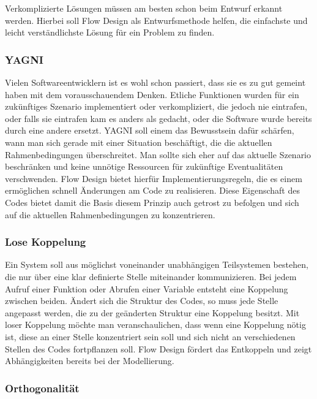 Verkomplizierte Lösungen müssen am besten schon beim Entwurf erkannt werden.
Hierbei soll Flow Design als Entwurfsmethode helfen, die einfachste und leicht
verständlichste Lösung für ein Problem zu finden.

\subsubsection{YAGNI}

Vielen Softwareentwicklern ist es wohl schon passiert, dass sie es zu gut gemeint
haben mit dem vorausschauendem Denken. Etliche Funktionen wurden für ein
zukünftiges Szenario implementiert oder verkompliziert, die jedoch nie
eintrafen, oder falls sie eintrafen kam es anders als gedacht, oder die Software
wurde bereits durch eine andere ersetzt.
YAGNI soll einem das Bewusstsein dafür schärfen, wann man sich gerade mit einer
Situation beschäftigt, die die aktuellen Rahmenbedingungen überschreitet.
Man sollte sich eher auf das aktuelle Szenario beschränken und keine unnötige Ressourcen für zukünftige
Eventualitäten verschwenden.
Flow Design bietet hierfür Implementierungsregeln, die es einem ermöglichen
schnell Änderungen am Code zu realisieren.
Diese Eigenschaft des Codes bietet damit die Basis diesem Prinzip auch getrost
zu befolgen und sich auf die aktuellen Rahmenbedingungen zu konzentrieren.

\subsubsection{Lose Koppelung}

Ein System soll aus möglichst voneinander unabhängigen Teilsystemen bestehen,
die nur über eine  klar definierte Stelle miteinander kommunizieren.
Bei jedem Aufruf einer Funktion oder Abrufen einer Variable entsteht eine
Koppelung zwischen beiden.
Ändert sich die Struktur des Codes, so muss jede Stelle angepasst werden, die zu
der geänderten Struktur eine Koppelung besitzt. Mit loser Koppelung möchte man
veranschaulichen, dass wenn eine Koppelung nötig ist, diese an einer Stelle konzentriert sein soll und
sich nicht an verschiedenen Stellen des Codes fortpflanzen soll.
Flow Design fördert das Entkoppeln und zeigt Abhängigkeiten bereits bei der Modellierung.

\subsubsection{Orthogonalität}

